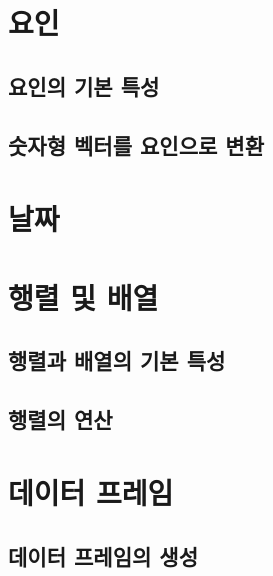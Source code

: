 \documentclass[
]{book}
\begin{document}
\hypertarget{uxc694uxc778}{%
\section{요인}\label{uxc694uxc778}}

\hypertarget{uxc694uxc778uxc758-uxae30uxbcf8-uxd2b9uxc131}{%
\subsection{요인의 기본 특성}\label{uxc694uxc778uxc758-uxae30uxbcf8-uxd2b9uxc131}}

\hypertarget{uxc22buxc790uxd615-uxbca1uxd130uxb97c-uxc694uxc778uxc73cuxb85c-uxbcc0uxd658}{%
\subsection{숫자형 벡터를 요인으로 변환}\label{uxc22buxc790uxd615-uxbca1uxd130uxb97c-uxc694uxc778uxc73cuxb85c-uxbcc0uxd658}}

\hypertarget{uxb0a0uxc9dc}{%
\section{날짜}\label{uxb0a0uxc9dc}}

\hypertarget{uxd589uxb82c-uxbc0f-uxbc30uxc5f4}{%
\section{행렬 및 배열}\label{uxd589uxb82c-uxbc0f-uxbc30uxc5f4}}

\hypertarget{uxd589uxb82cuxacfc-uxbc30uxc5f4uxc758-uxae30uxbcf8-uxd2b9uxc131}{%
\subsection{행렬과 배열의 기본 특성}\label{uxd589uxb82cuxacfc-uxbc30uxc5f4uxc758-uxae30uxbcf8-uxd2b9uxc131}}

\hypertarget{uxd589uxb82cuxc758-uxc5f0uxc0b0}{%
\subsection{행렬의 연산}\label{uxd589uxb82cuxc758-uxc5f0uxc0b0}}

\hypertarget{section-dataframe}{%
\section{데이터 프레임}\label{section-dataframe}}

\hypertarget{uxb370uxc774uxd130-uxd504uxb808uxc784uxc758-uxc0dduxc131}{%
\subsection{데이터 프레임의 생성}\label{uxb370uxc774uxd130-uxd504uxb808uxc784uxc758-uxc0dduxc131}}
\end{document}
